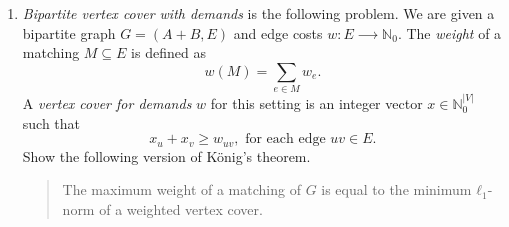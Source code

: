\begin{enumerate}
\begin{enumerate}[a)]
    \bigskip \noindent

    In the following, you are asked to design an integer program whose feasible solutions are solutions of a given Sudoku. The integer program has $9^3$ variables
    \begin{displaymath}
      x_{i,j,k} =
      \begin{cases}
        1 & \text{ if } s_{i,j} = k \\
        0 & \text{ otherwise.} 
      \end{cases}
    \end{displaymath}
    where $S ∈ \{0,\dots,9\}^{9 ×9}$ is the solution of the Sudoku represented by the variables. 


    The following set of constraints guarantees that each cell of the solution contains a number
    \begin{displaymath}
      1≤i,j≤9: \quad  ∑_{k=1}^9 x_{i,j,,k} = 1. 
    \end{displaymath}

    Write now constraints that guarantee the following.
    \begin{enumerate}[i)] 
    \item Each row must contain each number.
    \item Each column must contain each number.
    \item Each $B_{ij}$ must contain each number. 
    \end{enumerate}    
    Describe the final integer programming problem that links some of the variables to the input Sudoku. 
 \end{enumerate}
    
\item \label{e:weighted-vextex-cover}\emph{Bipartite vertex cover with demands} is the following problem. We are given a bipartite graph $G = (A+B,E)$ and edge costs $w: E ⟶ ℕ_0$.  The \emph{weight} of a matching  $M ⊆ E$ is defined as  
  \begin{displaymath}
   w(M) = ∑_{e ∈M} w_e. 
  \end{displaymath}
  A \emph{vertex cover for demands } $w$  for this setting is an integer vector $x ∈ ℕ_0^{|V|}$ such that
    \begin{displaymath}
      x_u + x_v ≥ w_{uv}, \text{ for each edge } uv ∈ E. 
    \end{displaymath}
    Show the following version of König's theorem.
    \begin{quote}
      The maximum weight of a matching of $G$ is equal to the minimum $ℓ_1$-norm of a weighted vertex cover. 
    \end{quote}
    

\end{enumerate}
